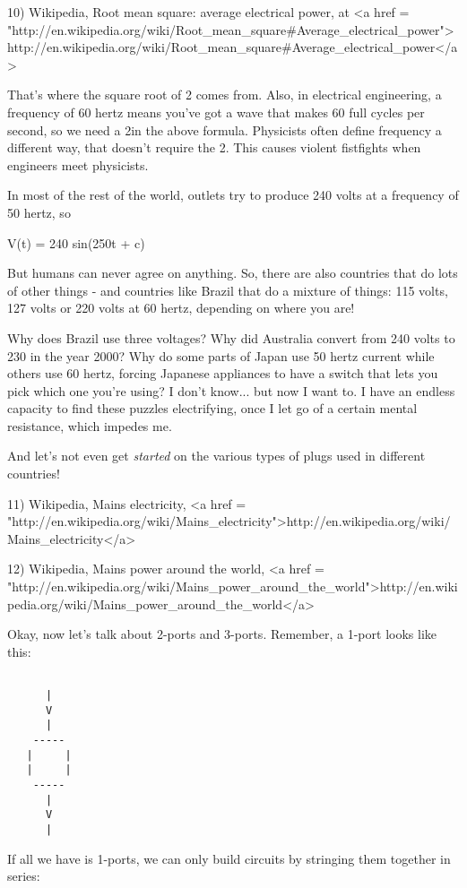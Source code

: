 10) Wikipedia, Root mean square: average electrical power, at
<a href = "http://en.wikipedia.org/wiki/Root_mean_square#Average_electrical_power">http://en.wikipedia.org/wiki/Root_mean_square#Average_electrical_power</a>

That's where the square root of 2 comes from.  Also, in electrical
engineering, a frequency of 60 hertz means you've got a wave that
makes 60 full cycles per second, so we need a 2\pi  in the above
formula.  Physicists often define frequency a different way, that
doesn't require the 2\pi .  This causes violent fistfights when
engineers meet physicists.

In most of the rest of the world, outlets try to produce 240 volts 
at a frequency of 50 hertz, so

V(t) =  240 sin(2\pi  50t + c)

But humans can never agree on anything.  So, there are also countries
that do lots of other things - and countries like Brazil that do a
mixture of things: 115 volts, 127 volts or 220 volts at 60 hertz,
depending on where you are!  

Why does Brazil use three voltages?  Why did Australia convert from 
240 volts to 230 in the year 2000?  Why do some parts of Japan use 50 
hertz current while others use 60 hertz, forcing Japanese appliances 
to have a switch that lets you pick which one you're using?  I don't 
know... but now I want to.  I have an endless capacity to find these
puzzles electrifying, once I let go of a certain mental resistance, 
which impedes me.

And let's not even get \emph{started} on the various types of plugs used 
in different countries!

11) Wikipedia, Mains electricity, 
<a href = "http://en.wikipedia.org/wiki/Mains_electricity">http://en.wikipedia.org/wiki/Mains_electricity</a>

12) Wikipedia, Mains power around the world,
<a href = "http://en.wikipedia.org/wiki/Mains_power_around_the_world">http://en.wikipedia.org/wiki/Mains_power_around_the_world</a>
 
Okay, now let's talk about 2-ports and 3-ports.  Remember, a 1-port
looks like this:


\begin{verbatim}

      |
      V
      |
    -----
   |     |
   |     |
    -----
      |
      V
      |
\end{verbatim}
    
If all we have is 1-ports, we can only build circuits by stringing
them together in series:



